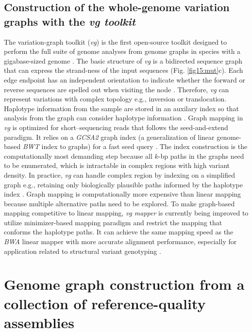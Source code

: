 \documentclass[../main.tex]{subfiles}
\begin{document}
\subsection*{Construction of the whole-genome variation graphs with the \emph{vg toolkit}}

The variation-graph toolkit (\emph{vg}) is the first open-source toolkit designed to perform the full suite of genome analyses from genome graphs in species with a gigabase-sized genome \citep{garrison2018variation}. The basic structure of \emph{vg} is a bidirected sequence graph that can express the strand-ness of the input sequences (Fig. \ref{fig15:mut}c). Each edge endpoint has an independent orientation to indicate whether the forward or reverse sequences are spelled out when visiting the node \citep{paten2017genome}. Therefore, \emph{vg} can represent variations with complex topology e.g., inversion or translocation. Haplotype information from the sample are stored in an auxilary index so that analysis from the graph can consider haplotype information \citep{siren2020haplotype}. Graph mapping in \emph{ vg} is optimized for short–sequencing reads that follows the seed-and-extend paradigm. It relies on a \emph{GCSA2 }graph index (a generalization of linear genome-based\emph{ BWT} index to graphs) for a fast seed query \citep{siren2017indexing}. The index construction is the computationally most demanding step because all $k$-bp paths in the graphs need to be enumerated, which is intractable in complex regions with high variant density. In practice, \emph{vg} can handle complex region by indexing on a simplified graph e.g., retaining only biologically plausible paths informed by the haplotype index \citep{siren2017indexing}. Graph mapping is computationally more expensive than linear mapping because multiple alternative paths need to be explored. To make graph-based mapping competitive to linear mapping, \emph{vg mapper} is currently being improved to utilize minimizer-based mapping paradigm and restrict the mapping that conforms the haplotype paths. It can achieve the same mapping speed as the \emph{BWA} linear mapper with more accurate alignment performance, especially for application related to structural variant genotyping \citep{siren2020genotyping}. 

\section[Construction of the multi-assembly graphs]{Genome graph construction from a collection of reference-quality assemblies}
\end{document}
